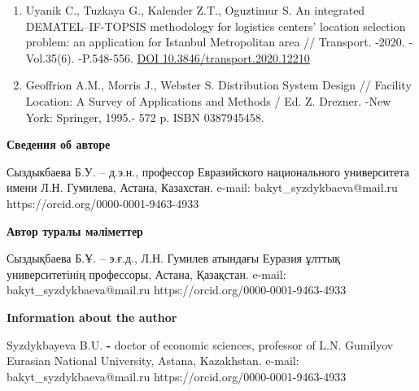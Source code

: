 \begin{enumerate}
{  products with uncertain demands} //
  \href{https://www.sciencedirect.com/journal/expert-systems-with-applications}{Expert
  Systems with Applications}. -2022. -Vol.209(2):118180.
  \href{https://doi.org/10.1016/j.eswa.2022.118180}{DOI
  10.1016/j.eswa.2022.118180}
\item
  Uyanik C., Tuzkaya G., Kalender Z.T., Oguztimur S. An integrated
  DEMATEL--IF-TOPSIS methodology for logistics centers' location
  selection problem: an application for Istanbul Metropolitan area //
  Transport. -2020. -Vol.35(6). -P.548-556.
  \href{https://doi.org/10.3846/transport.2020.12210}{DOI
  10.3846/transport.2020.12210}
\item
  Geoffrion A.M., Morris J., Webster S. Distribution System Design //
  Facility Location: A Survey of Applications and Methods / Ed. Z.
  Drezner. -New York: Springer, 1995.- 572 p. ISBN 0387945458.
\end{enumerate}

{\bfseries Сведения об авторе}

Сыздыкбаева Б.У. -- д.э.н., профессор Евразийского национального
университета имени Л.Н. Гумилева, Астана, Казахстан. e-mail:
bakyt\_syzdykbaeva@mail.ru https://orcid.org/0000-0001-9463-4933

{\bfseries Автор туралы мәліметтер}

Сыздықбаева Б.Ұ. -- э.ғ.д., Л.Н. Гумилев атындағы Еуразия ұлттық
университетінің профессоры, Астана, Қазақстан. e-mail:
bakyt\_syzdykbaeva@mail.ru https://orcid.org/0000-0001-9463-4933

{\bfseries Information about the author}

Syzdykbayeva B.U. {\bfseries -} doctor of economic sciences, professor of
L.N. Gumilyov Eurasian National University, Astana, Kazakhstan. e-mail:
bakyt\_syzdykbaeva@mail.ru https://orcid.org/0000-0001-9463-4933